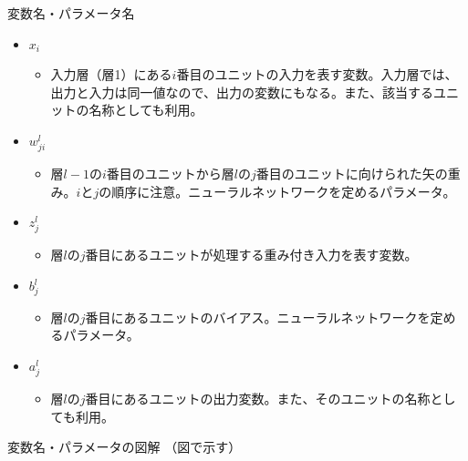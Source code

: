\documentclass[dvipdfmx,aspectratio=169]{beamer}
\begin{document}
	\begin{frame}{変数名・パラメータ名}
		\begin{itemize}
			\item $ x_i $
				\begin{itemize}
					\item 入力層（層1）にある$ i $番目のユニットの入力を表す変数。入力層では、出力と入力は同一値なので、出力の変数にもなる。また、該当するユニットの名称としても利用。
				\end{itemize}
			\item $ w^l_{ji} $
				\begin{itemize}
					\item 層$ l-1 $の$ i $番目のユニットから層$ l $の$ j $番目のユニットに向けられた矢の重み。$ i $と$ j $の順序に注意。ニューラルネットワークを定めるパラメータ。
				\end{itemize}
			\item $ z^l_j $
				\begin{itemize}
					\item 層$ l $の$ j $番目にあるユニットが処理する重み付き入力を表す変数。
				\end{itemize}
			\item $ b^l_j $
				\begin{itemize}
					\item 層$ l $の$ j $番目にあるユニットのバイアス。ニューラルネットワークを定めるパラメータ。
				\end{itemize}
			\item $ a^l_j $
				\begin{itemize}
					\item 層$ l $の$ j $番目にあるユニットの出力変数。また、そのユニットの名称としても利用。
				\end{itemize}
		\end{itemize}
	\end{frame}
	\begin{frame}{変数名・パラメータの図解}
		（図で示す）
	\end{frame}
	
\end{document}
